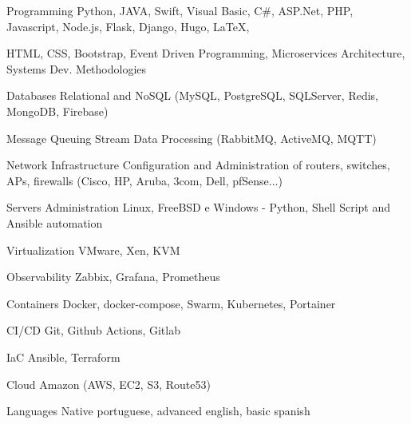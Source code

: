 

\begin{cvskills}

  \cvskill
    {Programming} %
    {Python, JAVA, Swift, Visual Basic, C\#, ASP.Net, PHP, Javascript, Node.js, Flask, Django, Hugo, LaTeX,} %

\cvskill
{} %
{HTML, CSS, Bootstrap, Event Driven Programming, Microservices Architecture, Systems Dev. Methodologies } %

\cvskill
    {Databases} %
    {Relational and NoSQL (MySQL, PostgreSQL, SQLServer, Redis, MongoDB, Firebase)} %

\cvskill
    {Message Queuing} %
    {Stream Data Processing (RabbitMQ, ActiveMQ, MQTT)} %

\cvskill
    {Network Infrastructure} %
    {Configuration and Administration of routers, switches, APs, firewalls (Cisco, HP, Aruba, 3com, Dell, pfSense...)} %

\cvskill
    {Servers Administration} %
    {Linux, FreeBSD e Windows - Python, Shell Script and Ansible automation} %

\cvskill
    {Virtualization} %
    {VMware, Xen, KVM} %

\cvskill
    {Observability} %
    {Zabbix, Grafana, Prometheus} %


\cvskill
    {Containers} %
    {Docker, docker-compose, Swarm, Kubernetes, Portainer} %

\cvskill
    {CI/CD} %
    {Git, Github Actions, Gitlab} %


\cvskill
    {IaC} %
    {Ansible, Terraform} %

\cvskill
    {Cloud} %
    {Amazon (AWS, EC2, S3, Route53)} %


  \cvskill
    {Languages} %
    {Native portuguese, advanced english, basic spanish} %

\end{cvskills}